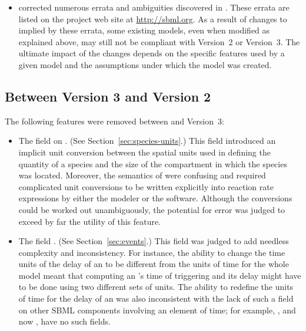 \begin{blockChanged}
\begin{itemize}
\item \sbmltwotwo corrected numerous errata and ambiguities
  discovered in \sbmltwoone.  These errata are listed on the
  project web site at \url{http://sbml.org}.  As a result of
  changes to \sbmltwo implied by these errata, some existing
  \sbmltwoone models, even when modified as explained above, may
  still not be compliant with Version~2 or Version~3.  The
  ultimate impact of the changes depends on the specific features
  used by a given model and the assumptions under which the model
  was created.

\end{itemize}




\subsection{Between Version 3 and Version 2}

The following features were removed between \sbmltwotwo and
Version~3:
\begin{itemize}

\item The  field on \Species.  (See
  Section~\ref{sec:species-units}.)  This field introduced an
  implicit unit conversion between the spatial units used in
  defining the quantity of a species and the size of the
  compartment in which the species was located.  Moreover, the
  semantics of  were confusing and
  required complicated unit conversions to be written explicitly
  into reaction rate expressions by either the modeler or the
  software.  Although the conversions could be worked out
  unambiguously, the potential for error was judged to exceed by
  far the utility of this feature.

\item The  field \Event.  (See
  Section~\ref{sec:events}.)  This field was judged to add
  needless complexity and inconsistency.  For instance, the
  ability to change the time units of the delay of an \Event to be
  different from the units of time for the whole model meant that
  computing an \Event's time of triggering and its delay might
  have to be done using two different sets of units.  The ability
  to redefine the units of time for the delay of an \Event was
  also inconsistent with the lack of such a field on other SBML
  components involving an element of time; for example, \RateRule,
  and now \KineticLaw, have no such fields.


\end{itemize}
\end{blockChanged}
